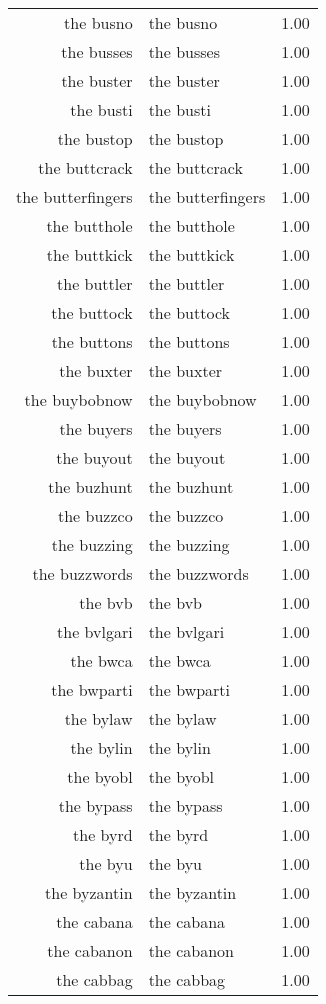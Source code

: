 \begin{table}[ht]
\begin{tabular}{rlr}
  the busno & the busno & 1.00 \\ 
  the busses & the busses & 1.00 \\ 
  the buster & the buster & 1.00 \\ 
  the busti & the busti & 1.00 \\ 
  the bustop & the bustop & 1.00 \\ 
  the buttcrack & the buttcrack & 1.00 \\ 
  the butterfingers & the butterfingers & 1.00 \\ 
  the butthole & the butthole & 1.00 \\ 
  the buttkick & the buttkick & 1.00 \\ 
  the buttler & the buttler & 1.00 \\ 
  the buttock & the buttock & 1.00 \\ 
  the buttons & the buttons & 1.00 \\ 
  the buxter & the buxter & 1.00 \\ 
  the buybobnow & the buybobnow & 1.00 \\ 
  the buyers & the buyers & 1.00 \\ 
  the buyout & the buyout & 1.00 \\ 
  the buzhunt & the buzhunt & 1.00 \\ 
  the buzzco & the buzzco & 1.00 \\ 
  the buzzing & the buzzing & 1.00 \\ 
  the buzzwords & the buzzwords & 1.00 \\ 
  the bvb & the bvb & 1.00 \\ 
  the bvlgari & the bvlgari & 1.00 \\ 
  the bwca & the bwca & 1.00 \\ 
  the bwparti & the bwparti & 1.00 \\ 
  the bylaw & the bylaw & 1.00 \\ 
  the bylin & the bylin & 1.00 \\ 
  the byobl & the byobl & 1.00 \\ 
  the bypass & the bypass & 1.00 \\ 
  the byrd & the byrd & 1.00 \\ 
  the byu & the byu & 1.00 \\ 
  the byzantin & the byzantin & 1.00 \\ 
  the cabana & the cabana & 1.00 \\ 
  the cabanon & the cabanon & 1.00 \\ 
  the cabbag & the cabbag & 1.00 \\ 

\end{tabular}
\end{table}
